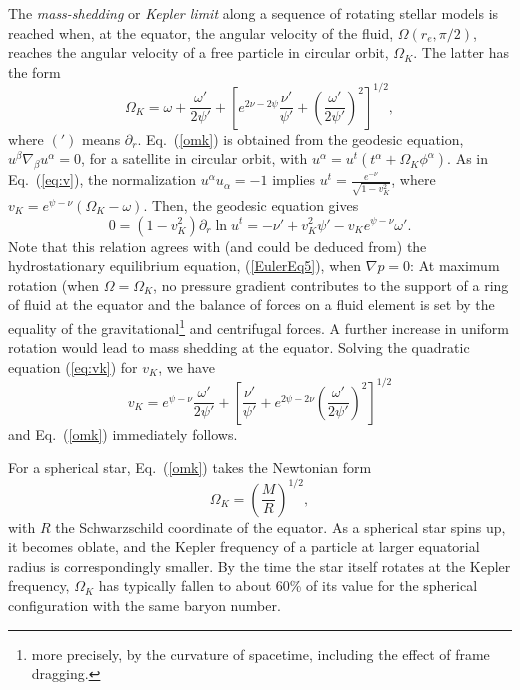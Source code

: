 \documentclass[12pt]{article}
\def\be{\begin{equation}}
\def\ee{\end{equation}}
\begin{document}
{%
%
The {\it mass-shedding} or {\it Kepler limit} along a sequence of rotating 
stellar models is reached when, at the equator, the angular velocity of the fluid, $\Omega(r_e,\pi/2)$, reaches the angular velocity of a free particle in circular orbit, $\Omega_K$. The latter has the form 
\be
\Omega_K = \omega+ \frac{\omega'}{2\psi'} 
        +\left[e^{2\nu -2\psi}\frac{\nu'}{\psi'}
        +\left(\frac{\omega'}{2\psi'}\right)^2\right]^{1/2},  
\label{omk}
\ee
where $(')$ means $\partial_r$.
Eq.~(\ref{omk}) is obtained from the geodesic equation,
$u^\beta \nabla_\beta u^\alpha =0$, for a satellite in circular 
orbit, with $u^\alpha = u^t(t^\alpha + \Omega_K\phi^\alpha)$.  
As in Eq.~(\ref{eq:v}),
the normalization $u^\alpha u_\alpha = -1$ implies 
$\displaystyle u^t = \frac{e^{-\nu}}{\sqrt{1-v_K^2}}$, where  
$v_K = e^{\psi-\nu}(\Omega_K-\omega)$. Then, the geodesic equation gives 
\be 
0 = (1-v_K^2)\partial_r\ln u^t 
= -\nu'+v_K^2\psi' -v_Ke^{\psi-\nu}\omega'.
\label{eq:vk}\ee
Note that this relation agrees with (and could be deduced from) 
the hydrostationary equilibrium equation, (\ref{EulerEq5}),
when $\nabla p=0$: At maximum rotation (when $\Omega=\Omega_K$, no 
pressure gradient contributes to the support of a ring of fluid at 
the equator and the balance of forces on a fluid element is set by
the equality of the gravitational\footnote{more precisely, by the
curvature of spacetime, including the effect of frame dragging.}
 and centrifugal forces. 
A further increase in uniform rotation would lead to mass shedding 
at the equator.
%
%
Solving the quadratic equation (\ref{eq:vk}) for $v_K$, we have 
\[ 
v_K = e^{\psi-\nu}\frac{\omega'}{2\psi'} +\left[\frac{\nu'}{\psi'} 
                +e^{2\psi-2\nu}\left(\frac{\omega'}{2\psi'}\right)^2\right]^{1/2}
\]
and Eq.~(\ref{omk}) immediately follows.

For a spherical star, Eq.~(\ref{omk}) takes the Newtonian form
\be
\Omega_K = \left(\frac MR\right)^{1/2},
\label{omksphere}\ee
with $R$ the Schwarzschild coordinate of the equator.
As a spherical star spins up, it becomes oblate, and the Kepler
frequency of a particle at larger equatorial radius is correspondingly
smaller.  By the time the star itself rotates at the Kepler frequency,
$\Omega_K$ has typically fallen to about 60\% of its value for the
spherical configuration with the same baryon number.

}
\end{document}
